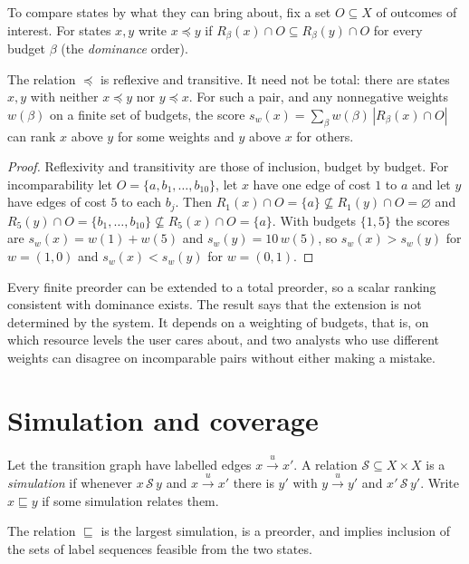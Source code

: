 To compare states by what they can bring about, fix a set $O\subseteq X$ of outcomes of interest. For states $x,y$ write $x\preceq y$ if $R_\beta(x)\cap O\subseteq R_\beta(y)\cap O$ for every budget $\beta$ (the \emph{dominance} order).

\begin{newresult}\label{prop:dominance}
The relation $\preceq$ is reflexive and transitive. It need not be total: there are states $x,y$ with neither $x\preceq y$ nor $y\preceq x$. For such a pair, and any nonnegative weights $w(\beta)$ on a finite set of budgets, the score $s_w(x)=\sum_\beta w(\beta)\,|R_\beta(x)\cap O|$ can rank $x$ above $y$ for some weights and $y$ above $x$ for others.
\end{newresult}
\begin{proof}
Reflexivity and transitivity are those of inclusion, budget by budget. For incomparability let $O=\{a,b_1,\dots,b_{10}\}$, let $x$ have one edge of cost $1$ to $a$ and let $y$ have edges of cost $5$ to each $b_j$. Then $R_1(x)\cap O=\{a\}\not\subseteq R_1(y)\cap O=\varnothing$ and $R_5(y)\cap O=\{b_1,\dots,b_{10}\}\not\subseteq R_5(x)\cap O=\{a\}$. With budgets $\{1,5\}$ the scores are $s_w(x)=w(1)+w(5)$ and $s_w(y)=10\,w(5)$, so $s_w(x)>s_w(y)$ for $w=(1,0)$ and $s_w(x)<s_w(y)$ for $w=(0,1)$.
\end{proof}

Every finite preorder can be extended to a total preorder, so a scalar ranking consistent with dominance exists. The result says that the extension is not determined by the system. It depends on a weighting of budgets, that is, on which resource levels the user cares about, and two analysts who use different weights can disagree on incomparable pairs without either making a mistake.

\section{Simulation and coverage}

Let the transition graph have labelled edges $x\xrightarrow{u}x'$. A relation $\mathcal S\subseteq X\times X$ is a \emph{simulation} if whenever $x\,\mathcal S\,y$ and $x\xrightarrow{u}x'$ there is $y'$ with $y\xrightarrow{u}y'$ and $x'\,\mathcal S\,y'$. Write $x\sqsubseteq y$ if some simulation relates them.

\begin{established}\label{thm:simulation}
The relation $\sqsubseteq$ is the largest simulation, is a preorder, and implies inclusion of the sets of label sequences feasible from the two states.
\end{established}

